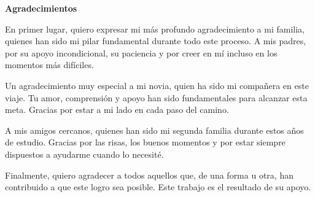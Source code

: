 {\Large \textbf{Agradecimientos} \vspace{.3cm}}

En primer lugar, quiero expresar mi más profundo agradecimiento a mi familia, quienes han sido mi pilar fundamental durante todo este proceso. A mis padres, por su apoyo incondicional, su paciencia y por creer en mí incluso en los momentos más difíciles.

Un agradecimiento muy especial a mi novia, quien ha sido mi compañera en este viaje. Tu amor, comprensión y apoyo han sido fundamentales para alcanzar esta meta. Gracias por estar a mi lado en cada paso del camino.

A mis amigos cercanos, quienes han sido mi segunda familia durante estos años de estudio. Gracias por las risas, los buenos momentos y por estar siempre dispuestos a ayudarme cuando lo necesité.

Finalmente, quiero agradecer a todos aquellos que, de una forma u otra, han contribuido a que este logro sea posible. Este trabajo es el resultado de su apoyo.
